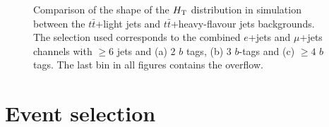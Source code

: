 \begin{figure}[h!tb]\begin{center}
	\caption{Comparison of the shape of the $\HT$ distribution in simulation between the $t\bar{t}$+light jets and $t\bar{t}$+heavy-flavour jets backgrounds.
The selection used corresponds to the combined $e$+jets and $\mu$+jets channels with $\geq 6$ jets and (a) 2 $b$ tags, 
(b) 3 $b$-tags and (c) $\geq 4$ $b$ tags. The last bin in all figures contains the overflow.\label{fig:HT_checks_ttjetsComp}}
\end{center}\end{figure}




\section{Event selection}\label{sec:htxEVT}


